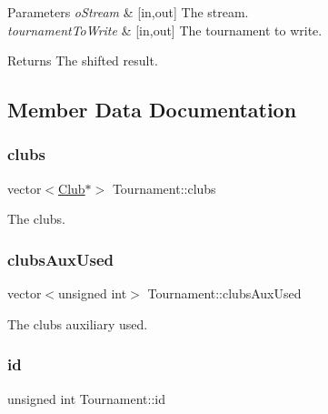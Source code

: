 \begin{DoxyParams}{Parameters}
{\em o\+Stream} & \mbox{[}in,out\mbox{]} The stream. \\
\hline
{\em tournament\+To\+Write} & \mbox{[}in,out\mbox{]} The tournament to write. \\
\hline
\end{DoxyParams}


\begin{DoxyReturn}{Returns}
The shifted result. 
\end{DoxyReturn}


\subsection{Member Data Documentation}
\hypertarget{class_tournament_a0bc3b92b52e1e0b13c466f5e14100a10}{}\label{class_tournament_a0bc3b92b52e1e0b13c466f5e14100a10} 
\subsubsection{\texorpdfstring{clubs}{clubs}}
{\footnotesize\ttfamily vector$<$\hyperlink{class_club}{Club}$\ast$$>$ Tournament\+::clubs\hspace{0.3cm}{\ttfamily [private]}}



The clubs. 

\hypertarget{class_tournament_a23735b59d67642c8e8e826b9638d588c}{}\label{class_tournament_a23735b59d67642c8e8e826b9638d588c} 
\subsubsection{\texorpdfstring{clubs\+Aux\+Used}{clubsAuxUsed}}
{\footnotesize\ttfamily vector$<$unsigned int$>$ Tournament\+::clubs\+Aux\+Used\hspace{0.3cm}{\ttfamily [private]}}



The clubs auxiliary used. 

\hypertarget{class_tournament_a15cf54c0cde58d9a29c9700808173a8c}{}\label{class_tournament_a15cf54c0cde58d9a29c9700808173a8c} 
\subsubsection{\texorpdfstring{id}{id}}
{\footnotesize\ttfamily unsigned int Tournament\+::id\hspace{0.3cm}{\ttfamily [private]}}



